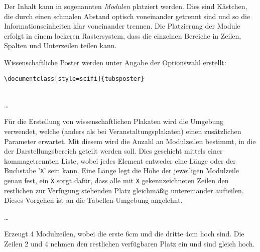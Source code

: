 Der Inhalt kann in sogenannten \emph{Modulen} platziert werden.
Dies sind Kästchen, die durch einen schmalen Abstand optisch
voneinander getrennt sind und so die Informationseinheiten klar voneinander
trennen.
Die Platzierung der Module erfolgt in einem lockeren Rastersystem,
dass die einzelnen Bereiche in Zeilen, Spalten und Unterzeilen teilen kann.

Wissenschaftliche Poster werden unter Angabe der Optionswahl
 erstellt:
\begin{lstlisting}
\documentclass[style=scifi]{tubsposter}
\end{lstlisting}

\begin{Declaration}
    \\
  \quad\dots\\
\end{Declaration}

Für die Erstellung von wissenschaftlichen Plakaten wird die Umgebung
 verwendet, welche
(anders als bei Veranstaltungsplakaten) einen
zusätzlichen Parameter  erwartet.
Mit diesem wird die Anzahl an Modulzeilen bestimmt, in die der Darstellungsbereich geteilt werden soll. Dies geschieht mittels einer kommagetrennten Liste,
wobei jedes Element entweder eine Länge oder der Buchstabe '\texttt{X}' sein kann.
Eine Länge legt die Höhe der jeweiligen Modulzeile genau fest,
ein \texttt{X} sorgt dafür, dass alle mit \texttt{X} gekennzeichneten
Zeilen den restlichen zur Verfügung stehenden Platz gleichmäßig untereinander
aufteilen.
Dieses Vorgehen ist an die Tabellen-Umgebung  angelehnt.

\begin{minipage}{0.6\textwidth}
\begin{Example}\par
  \noindent{}
    \par
  \quad\dots\\
  \bigskip\par
  \noindent Erzeugt 4 Modulzeilen, wobei die erste 6cm und die dritte 4cm hoch sind.
  Die Zeilen 2 und 4 nehmen den restlichen verfügbaren Platz ein
  und sind gleich hoch.
\end{Example}
\end{minipage}
\hfill
\begin{minipage}{0.3\textwidth}\centering
\end{minipage}

